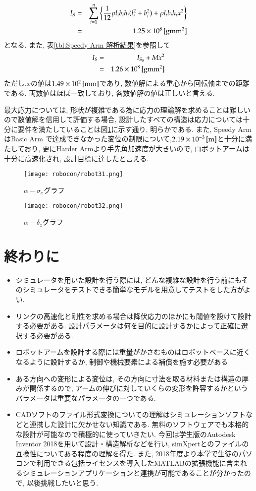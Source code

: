 \documentclass[10pt,b5paper,papersize,dvipdfmx]{jsbook}
\begin{document}
\begin{eqnarray}
  I_S&=&\sum_{i=1}^{n} \left\{ \frac{1}{12} \rho l_ib_ih_i(l_i^2+b_i^2)+\rho l_ib_ih_ix^2 \right\}\\
  &=&1.25\times10^8\tani*{g mm^2}
\end{eqnarray}
となる. また, 表\ref{tbl:Speedy Arm 解析結果}を参照して
\begin{eqnarray}
  I_S&=&I_{S_0}+Mx^2\\
  &=&1.26\times10^8\tani*{g mm^2}
\end{eqnarray}
ただし,$x$の値は$1.49\times10^2 \tani*{mm}$であり, 数値解による重心から回転軸までの距離である. 両数値はほぼ一致しており, 各数値解の値は正しいと言える.\par
最大応力については, 形状が複雑である為に応力の理論解を求めることは難しいので数値解を信用して評価する場合, 設計したすべての構造は応力については十分に要件を満たしていることは図\ref{fig:alpha-sigma_xグラフ}に示す通り, 明らかである. また, Speedy ArmはBasic Arm で達成できなかった変位の制限について,$2.19\times10^{-3} \tani*{m}$と十分に満たしており, 更にHarder Armより手先角加速度が大きいので, ロボットアームは十分に高速化され, 設計目標に達したと言える.

\begin{figure}[htbp]
  \centering
  \texttt{[image: robocon/robot31.png]}
  \caption{$\alpha-\sigma_x$グラフ}
  \label{fig:alpha-sigma_xグラフ}
\end{figure}
\begin{figure}[htbp]
  \centering
  \texttt{[image: robocon/robot32.png]}
  \caption{$\alpha-\delta_z$グラフ}
  \label{fig:alpha-delta_zグラフ}
\end{figure}
\section{終わりに}
\begin{itemize}
\item シミュレータを用いた設計を行う際には, どんな複雑な設計を行う前にもそのシミュレータをテストできる簡単なモデルを用意してテストをした方がよい.
\item リンクの高速化と剛性を求める場合は降伏応力のほかにも閾値を設けて設計する必要がある. 設計パラメータは何を目的に設計するかによって正確に選択する必要がある. 
\item ロボットアームを設計する際には重量がかさむものはロボットベースに近くなるように設計するか, 制御や機械要素による補償を施す必要がある
\item ある方向への変形による変位は, その方向に寸法を取る材料または構造の厚みが関係するので, アームの伸びに対していくらの変形を許容するかというパラメータは重要なパラメータの一つである.
\item CADソフトのファイル形式変換についての理解はシミュレーションソフトなどと連携した設計に欠かせない知識である. 無料のソフトウェアでも本格的な設計が可能なので積極的に使っていきたい. 今回は学生版のAutodesk Inventor 2018を用いて設計・構造解析などを行い, simXpertとのファイルの互換性についてある程度の理解を得た. また, 2018年度より本学で生徒のパソコンで利用できる包括ライセンスを導入したMATLABの拡張機能に含まれるシミュレーションアプリケーションと連携が可能であることが分かったので, 以後挑戦したいと思う. 
\end{itemize}
\end{document}

